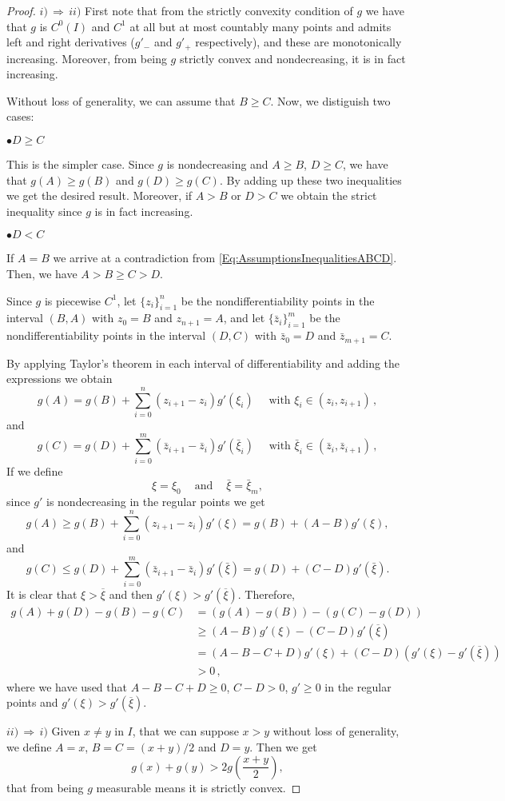 \begin{proof}
$i)\, \Rightarrow \,ii)$
First note that from the strictly convexity condition of $g$ we have that $g$ is $C^0(I)$ and $C^1$ at all but at most countably many points and admits left and right derivatives ($g'_-$ and $g'_+$ respectively), and these are monotonically increasing. Moreover, from being $g$ strictly convex and nondecreasing, it is in fact increasing.

Without loss of generality, we can assume that $B \geq C$. Now, we distiguish two cases:

$\bullet D \geq C$

This is the simpler case. Since $g$ is nondecreasing and $A \geq B$, $D \geq C$, we have that $g(A) \geq g(B)$ and $g(D) \geq g(C)$. By adding up these two inequalities we get the desired result. Moreover, if $A>B$ or $D>C$ we obtain the strict inequality since $g$ is in fact increasing.

$\bullet D < C$

If $A = B$ we arrive at a contradiction from \eqref{Eq:AssumptionsInequalitiesABCD}. Then, we have $A > B \geq C > D$. 

Since $g$ is piecewise $C^1$, let $\{z_i\}_{i=1}^{n}$ be the nondifferentiability points in the interval $(B,A)$ with $z_0 = B$ and $z_{n+1}=A$, and let $\{\bar{z}_i\}_{i=1}^{m}$ be the nondifferentiability points in the interval $(D,C)$ with $\bar{z}_0 = D$ and $\bar{z}_{m+1}=C$.

By applying Taylor's theorem in each interval of differentiability and adding the expressions we obtain
$$
g(A) = g(B) + \sum_{i=0}^{n}(z_{i+1}-z_i) g'(\xi_i) \quad \textrm{ with } \xi_i \in (z_i,z_{i+1})\,,
$$
and
$$
g(C) = g(D) + \sum_{i=0}^{m}(\bar{z}_{i+1}-\bar{z}_i) g'(\bar{\xi}_i) \quad \textrm{ with } \bar{\xi}_i \in (\bar{z}_i,\bar{z}_{i+1})\,,
$$
If we define
$$ \xi = \xi_0 \ \ \ \ \textrm{ and } \ \ \ \ \bar{\xi} = \bar{\xi}_m
,$$
since $g'$ is nondecreasing in the regular points we get
$$
g(A) \geq g(B) + \sum_{i=0}^{n}(z_{i+1}-z_i) g'(\xi) = g(B) + (A-B)g'(\xi),
$$
and
$$
g(C) \leq g(D) + \sum_{i=0}^{m}(\bar{z}_{i+1}-\bar{z}_i) g'(\bar{\xi}) = g(D)+(C-D)g'(\bar{\xi}).
$$
It is clear that $\xi > \overline{\xi}$ and then $g'(\xi) > g'(\overline{\xi})$. Therefore,
\begin{align*}
g(A) + g(D) - g(B) - g(C) &= (g(A) - g(B)) - (g(C) - g(D)) \\
&\geq (A - B)g'(\xi)  - (C - D)g'(\overline{\xi}) \\
&= (A - B - C + D)g'(\xi) + (C - D) (g'(\xi) - g'(\overline{\xi}))\\
& > 0\,,
\end{align*}
where we have used that $A - B - C + D \geq 0$, $C - D > 0$, $g'\geq 0$ in the regular points and $g'(\xi) > g'(\overline{\xi})$.

$ii)\, \Rightarrow \,i)$ Given $x\neq y$ in $I$, that we can suppose $x>y$ without loss of generality, we define $A=x$, $B=C=(x+y)/2$ and $D=y$. Then we get
$$ g(x)+g(y) > 2g\left( \frac{x+y}{2} \right), $$
that from being $g$ measurable means it is strictly convex.
\end{proof}

